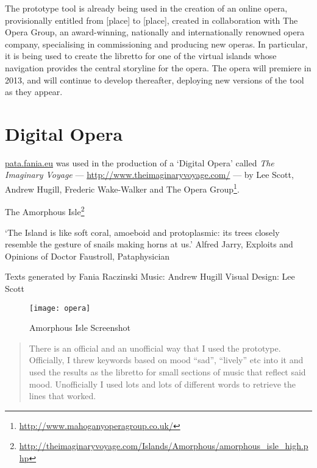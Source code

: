\begin{draft}
  The prototype tool is already being used in the creation of an online opera, provisionally entitled from [place] to [place], created in collaboration with The Opera Group, an award-winning, nationally and internationally renowned opera company, specialising in commissioning and producing new operas. In particular, it is being used to create the libretto for one of the virtual islands whose navigation provides the central storyline for the opera. The opera will premiere in 2013, and will continue to develop thereafter, deploying new versions of the tool as they appear.
\end{draft}


\section{Digital Opera}

\url{pata.fania.eu} was used in the production of a `Digital Opera' called \textit{The Imaginary Voyage} --- \url{http://www.theimaginaryvoyage.com/} --- by Lee Scott, Andrew Hugill, Frederic Wake-Walker and The Opera Group\footnote{\url{http://www.mahoganyoperagroup.co.uk/}}.

The Amorphous Isle\footnote{\url{http://theimaginaryvoyage.com/Islands/Amorphous/amorphous_isle_high.php}}

`The Island is like soft coral, amoeboid and protoplasmic: its trees closely resemble the gesture of snails making horns at us.'
Alfred Jarry, Exploits and Opinions of Doctor Faustroll, Pataphysician


Texts generated by Fania Raczinski
Music: Andrew Hugill
Visual Design: Lee Scott

\begin{figure}[h!]
  \centering
  \texttt{[image: opera]}
\caption[Amorphous Isle Screenshot]{Amorphous Isle Screenshot}
\label{fig:opera}
\end{figure}

\begin{quotation}
  There is an official and an unofficial way that I used the prototype. Officially, I threw keywords based on mood ``sad'', ``lively'' etc into it and used the results as the libretto for small sections of music that reflect said mood. Unofficially I used lots and lots of different words to retrieve the lines that worked. 
\end{quotation}

